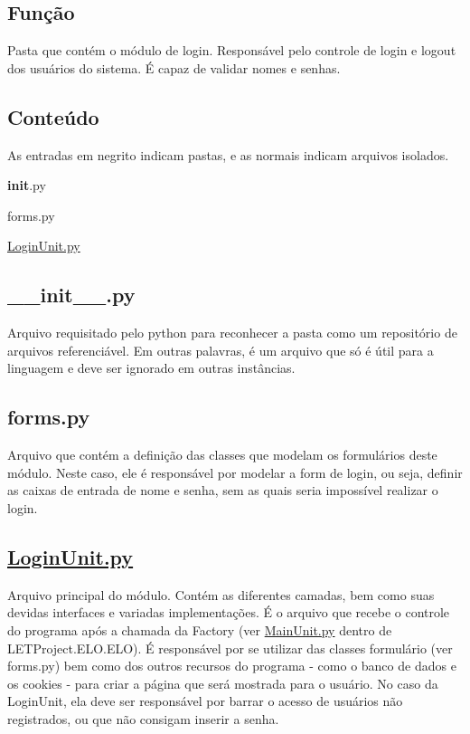 \subsection*{Função}

Pasta que contém o módulo de login. Responsável pelo controle de login e logout dos usuários do sistema. É capaz de validar nomes e senhas.

\subsection*{Conteúdo}

As entradas em negrito indicam pastas, e as normais indicam arquivos isolados.


\begin{DoxyItemize}
\item {\bfseries init}.py
\item forms.\-py
\item \hyperlink{LoginUnit_8py}{Login\-Unit.\-py}
\end{DoxyItemize}

\subsection*{\-\_\-\-\_\-init\-\_\-\-\_\-.\-py}

Arquivo requisitado pelo python para reconhecer a pasta como um repositório de arquivos referenciável. Em outras palavras, é um arquivo que só é útil para a linguagem e deve ser ignorado em outras instâncias.

\subsection*{forms.\-py}

Arquivo que contém a definição das classes que modelam os formulários deste módulo. Neste caso, ele é responsável por modelar a form de login, ou seja, definir as caixas de entrada de nome e senha, sem as quais seria impossível realizar o login.

\subsection*{\hyperlink{LoginUnit_8py}{Login\-Unit.\-py}}

Arquivo principal do módulo. Contém as diferentes camadas, bem como suas devidas interfaces e variadas implementações. É o arquivo que recebe o controle do programa após a chamada da Factory (ver \hyperlink{MainUnit_8py}{Main\-Unit.\-py} dentro de L\-E\-T\-Project.\-E\-L\-O.\-E\-L\-O). É responsável por se utilizar das classes formulário (ver forms.\-py) bem como dos outros recursos do programa -\/ como o banco de dados e os cookies -\/ para criar a página que será mostrada para o usuário. No caso da Login\-Unit, ela deve ser responsável por barrar o acesso de usuários não registrados, ou que não consigam inserir a senha. 